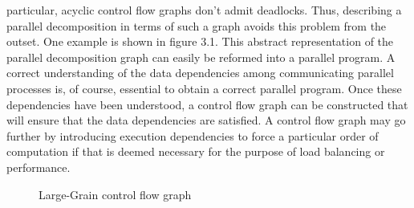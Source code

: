 particular, acyclic control flow graphs don't admit deadlocks. Thus, describing a parallel decomposition in terms of such a graph avoids this problem from the
outset. One example is shown in figure 3.1. This abstract representation of the parallel decomposition graph can easily be reformed into a parallel program.
A correct understanding of the data dependencies among communicating parallel processes is, of course, essential to obtain a correct parallel program.
Once these dependencies have been understood, a control flow graph can be constructed that will ensure that the data dependencies are satisfied. A control flow
graph may go further by introducing execution dependencies to force a particular order of computation if that is deemed necessary for the purpose of load
balancing or performance. 

\begin{figure}[ht]
{\centering {} \par}
\caption{Large-Grain control flow graph}
\end{figure}

